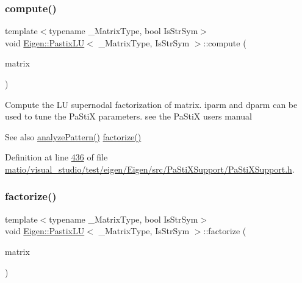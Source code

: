 \subsubsection{\texorpdfstring{compute()}{compute()}\hspace{0.1cm}{\footnotesize\ttfamily [2/2]}}
{\footnotesize\ttfamily template$<$typename \+\_\+\+Matrix\+Type, bool Is\+Str\+Sym$>$ \\
void \hyperlink{class_eigen_1_1_pastix_l_u}{Eigen\+::\+Pastix\+LU}$<$ \+\_\+\+Matrix\+Type, Is\+Str\+Sym $>$\+::compute (\begin{DoxyParamCaption}\item[{const Matrix\+Type \&}]{matrix }\end{DoxyParamCaption})\hspace{0.3cm}{\ttfamily [inline]}}

Compute the LU supernodal factorization of {\ttfamily matrix}. iparm and dparm can be used to tune the Pa\+StiX parameters. see the Pa\+StiX user\textquotesingle{}s manual \begin{DoxySeeAlso}{See also}
\hyperlink{class_eigen_1_1_pastix_l_u_abae3ca7f1254106d9e2d5e0f273189fa}{analyze\+Pattern()} \hyperlink{class_eigen_1_1_pastix_l_u_ac178a87b499a2210a402787fbfd98f26}{factorize()} 
\end{DoxySeeAlso}


Definition at line \hyperlink{matio_2visual__studio_2test_2eigen_2_eigen_2src_2_pa_sti_x_support_2_pa_sti_x_support_8h_source_l00436}{436} of file \hyperlink{matio_2visual__studio_2test_2eigen_2_eigen_2src_2_pa_sti_x_support_2_pa_sti_x_support_8h_source}{matio/visual\+\_\+studio/test/eigen/\+Eigen/src/\+Pa\+Sti\+X\+Support/\+Pa\+Sti\+X\+Support.\+h}.

\mbox{\label{class_eigen_1_1_pastix_l_u_ac178a87b499a2210a402787fbfd98f26}} 
\subsubsection{\texorpdfstring{factorize()}{factorize()}\hspace{0.1cm}{\footnotesize\ttfamily [1/2]}}
{\footnotesize\ttfamily template$<$typename \+\_\+\+Matrix\+Type, bool Is\+Str\+Sym$>$ \\
void \hyperlink{class_eigen_1_1_pastix_l_u}{Eigen\+::\+Pastix\+LU}$<$ \+\_\+\+Matrix\+Type, Is\+Str\+Sym $>$\+::factorize (\begin{DoxyParamCaption}\item[{const Matrix\+Type \&}]{matrix }\end{DoxyParamCaption})\hspace{0.3cm}{\ttfamily [inline]}}

